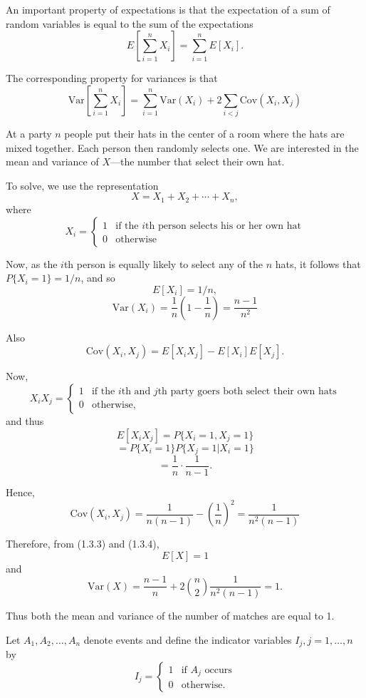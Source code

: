 \documentclass[lang=cn,10pt,thmcnt=section]{elegantbook}
\begin{document}
An important property of expectations is that the expectation of a sum of random variables is equal to the sum of the expectations
\begin{equation}
E\left[\sum_{i=1}^{n} X_i\right] = \sum_{i=1}^{n} E[X_i].
\end{equation}

The corresponding property for variances is that
\begin{equation}
\text{Var}\left[\sum_{i=1}^n X_i\right] = \sum_{i=1}^n \text{Var}(X_i) + 2 \sum_{i<j} \text{Cov}(X_i, X_j)
\end{equation}

\begin{example}
	At a party \(n\) people put their hats in the center of a room where the hats are mixed together. Each person then randomly selects one. We are interested in the mean and variance of \(X\)—the number that select their own hat.
\end{example} 
To solve, we use the representation
\[
X = X_1 + X_2 + \cdots + X_n,
\]
where
\[
X_i = \begin{cases}
1 & \text{if the } i\text{th person selects his or her own hat} \\
0 & \text{otherwise}
\end{cases}
\]

Now, as the \(i\)th person is equally likely to select any of the \(n\) hats, it follows that \(P\{X_i = 1\} = 1/n\), and so
\[
E[X_i] = 1/n,
\]
\[
\text{Var}(X_i) = \frac{1}{n}\left(1 - \frac{1}{n}\right) = \frac{n - 1}{n^2}
\]

Also
\[
\text{Cov}(X_i, X_j) = E[X_i X_j] - E[X_i]E[X_j].
\]

Now,
\[
X_i X_j = \begin{cases}
1 & \text{if the } i\text{th and } j\text{th party goers both select their own hats} \\
0 & \text{otherwise},
\end{cases}
\]
and thus
\[
E[X_i X_j] = P\{X_i = 1, X_j = 1\}
\]
\[
= P\{X_i = 1\} P\{X_j = 1 | X_i = 1\}
\]
\[
= \frac{1}{n} \cdot \frac{1}{n - 1}.
\]

Hence,
\[
\text{Cov}(X_i, X_j) = \frac{1}{n(n-1)} - \left(\frac{1}{n}\right)^2 = \frac{1}{n^2(n-1)}
\]

Therefore, from (1.3.3) and (1.3.4),
\[
E[X] = 1
\]
and
\[
\text{Var}(X) = \frac{n-1}{n} + 2 \binom{n}{2} \frac{1}{n^2(n-1)} = 1.
\]

Thus both the mean and variance of the number of matches are equal to 1. 
\begin{example}
	Let \(A_1, A_2, \ldots, A_n\) denote events and define the indicator variables \(I_j, j = 1, \ldots, n\) by
\[
I_j = \begin{cases}
1 & \text{if } A_j \text{ occurs} \\
0 & \text{otherwise}.
\end{cases}
\]
\end{example} 
\end{document}
